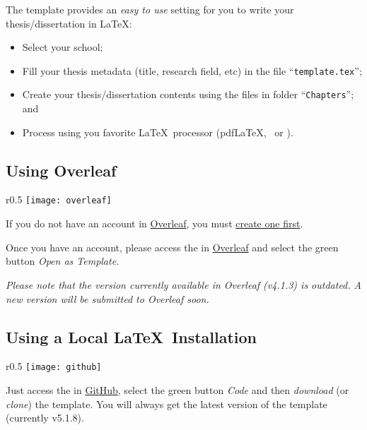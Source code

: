 The template provides an \emph{easy to use} setting for you to write your thesis/dissertation in \LaTeX:
\begin{itemize}
  \item  Select your school;
  \item Fill your thesis metadata (title, research field, etc) in the file “\texttt{template.tex}”;
  \item Create your thesis/dissertation contents using the files in folder “\texttt{Chapters}”; and
  \item Process using you favorite \LaTeX\ processor (pdf\LaTeX, \XeLaTeX\ or \LuaLaTeX).
\end{itemize}

\subsection{Using Overleaf}
\label{sub:using_overleaf}

\begin{wrapfigure}{r}{0.5\linewidth}
\vspace*{-15ex}\texttt{[image: overleaf]}%
\end{wrapfigure}

If you do not have an account in \href{https://www.overleaf.com?r=f5160636&rm=d&rs=b}{Overleaf}, you must \href{https://www.overleaf.com?r=f5160636&rm=d&rs=b}{create one first}.

Once you have an account, please access the  in \href{https://www.overleaf.com/latex/templates/new-university-of-lisbon-universidade-nova-de-lisboa-slash-unl-thesis-template/fwbztcrptjmg}{Overleaf} and select the green button \emph{Open as Template}. 

\emph{Please note that the version currently available in Overleaf (v4.1.3) is outdated. A new version will be submitted to Overleaf soon.}  

\subsection{Using a Local \LaTeX\ Installation}
\label{sub:using_local_latex}

\begin{wrapfigure}{r}{0.5\linewidth}
\vspace*{-15ex}\texttt{[image: github]}%
\end{wrapfigure}

Just access the  in \href{https://github.com/joaomlourenco/novathesis}{GitHub}, select the green button \emph{Code} and then \emph{download} (or \emph{clone}) the template.  You will always get the latest version of the template (currently v5.1.8).


